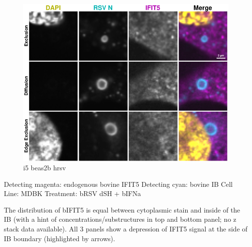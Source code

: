 \begin{figure}
    \centering
    \includegraphics[width=1\linewidth]{09. Chapter 4/Figs/02. Infection/03. IFIT5/06. beas2b i5.pdf}
    \caption[i5 beas2b hrsv]{i5 beas2b hrsv}
    \label{fig:i5 beas2b hrsv}
\end{figure}

Detecting magenta: endogenous bovine IFIT5 \newline
Detecting cyan: bovine IB \newline
Cell Line: MDBK \newline
Treatment: bRSV dSH + bIFNa \newline

The distribution of bIFIT5 is equal between cytoplasmic stain and inside of the IB (with a hint of concentrations/substructures in top and bottom panel; no z stack data available). All 3 panels show a depression of IFIT5 signal at the side of IB boundary (highlighted by arrows).

